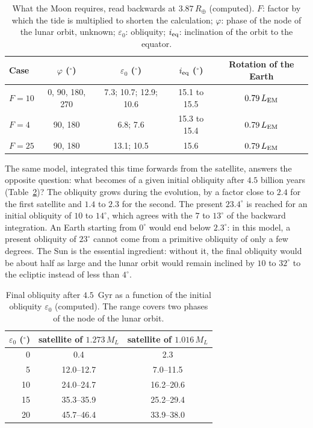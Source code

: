 \documentclass[11pt,a4paper]{article}
\newcommand{\Rt}{\ensuremath{R_\oplus}}
\newcommand{\ML}{\ensuremath{M_L}}
\newcommand{\LEM}{\ensuremath{L_{\rm EM}}}
\begin{document}
\begin{table}[htbp]
\centering
\caption{What the Moon requires, read backwards at $3.87\,\Rt$ (computed). $F$: factor by which the tide is multiplied to shorten the calculation; $\varphi$: phase of the node of the lunar orbit, unknown; $\varepsilon_0$: obliquity; $i_{\rm eq}$: inclination of the orbit to the equator.\label{tab:retro}}
\small
\begin{tabular}{lcccc}
\toprule
Case & $\varphi$ ($^\circ$) & $\varepsilon_0$ ($^\circ$) & $i_{\rm eq}$ ($^\circ$) & Rotation of the Earth \\
\midrule
$F=10$ & 0, 90, 180, 270 & 7.3; 10.7; 12.9; 10.6 & 15.1 to 15.5 & $0.79\,\LEM$ \\
$F=4$ & 90, 180 & 6.8; 7.6 & 15.3 to 15.4 & $0.79\,\LEM$ \\
$F=25$ & 90, 180 & 13.1; 10.5 & 15.6 & $0.79\,\LEM$ \\
\bottomrule
\end{tabular}
\end{table}

The same model, integrated this time forwards from the satellite, answers the opposite question: what becomes of a given initial obliquity after $4.5$ billion years (Table~\ref{tab:obl})? The obliquity grows during the evolution, by a factor close to $2.4$ for the first satellite and $1.4$ to $2.3$ for the second. The present $23.4^\circ$ is reached for an initial obliquity of $10$ to $14^\circ$, which agrees with the $7$ to $13^\circ$ of the backward integration. An Earth starting from $0^\circ$ would end below $2.3^\circ$: in this model, a present obliquity of $23^\circ$ cannot come from a primitive obliquity of only a few degrees. The Sun is the essential ingredient: without it, the final obliquity would be about half as large and the lunar orbit would remain inclined by $10$ to $32^\circ$ to the ecliptic instead of less than $4^\circ$.

\begin{table}[htbp]
\centering
\caption{Final obliquity after $4.5$~Gyr as a function of the initial obliquity $\varepsilon_0$ (computed). The range covers two phases of the node of the lunar orbit.\label{tab:obl}}
\small
\begin{tabular}{rcc}
\toprule
$\varepsilon_0$ ($^\circ$) & satellite of $1.273\,\ML$ & satellite of $1.016\,\ML$ \\
\midrule
0 & 0.4 & 2.3 \\
5 & 12.0--12.7 & 7.0--11.5 \\
10 & 24.0--24.7 & 16.2--20.6 \\
15 & 35.3--35.9 & 25.2--29.4 \\
20 & 45.7--46.4 & 33.9--38.0 \\
\bottomrule
\end{tabular}
\end{table}
\end{document}
